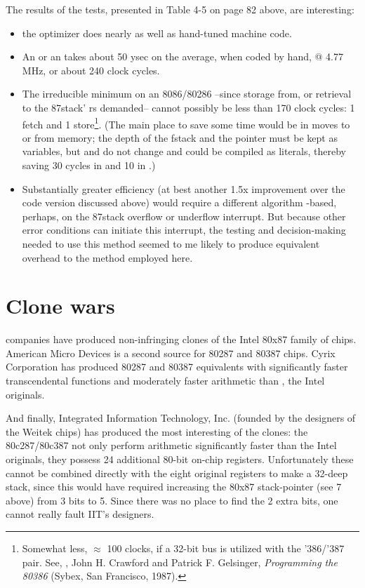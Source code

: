 The results of the tests, presented in Table 4-5 on page 82 above,
are interesting:
\begin{itemize}
    \item the optimizer does nearly as well as hand-tuned machine code.
    \item An  or an  takes about 50 ysec on the average, when coded by hand, @ 4.77 MHz, or about 240 clock cycles.
    \item The irreducible minimum on an 8086/80286 --since  storage from, or retrieval to the 87stack' rs demanded-- cannot possibly be less than 170 clock cycles: 1 fetch and 1 store\footnote{Somewhat less, $\approx$ 100 clocks, if a 32-bit bus is utilized with the '386/'387 pair. See, \eg, John H. Crawford and Patrick F. Gelsinger, \textit{Programming the 80386} (Sybex, San Francisco, 1987).}. (The main place to save some time would be in moves to or from memory; the depth of the fstack and the pointer must be kept as variables, but  and  do not change and could be compiled as literals, thereby saving 30 cycles in  and 10 in .)
    \item Substantially greater efficiency (at best another 1.5x improvement over the code version discussed above) would require a different algorithm -based, perhaps, on the 87stack overflow or underflow interrupt. But because other error conditions can initiate this interrupt, the testing and decision-making needed to use this method seemed to me likely to produce equivalent overhead to the method employed here.
\end{itemize}
\section{Clone wars}

 companies have produced non-infringing clones of the Intel 80x87 family of chips. American Micro Devices is a second source for 80287 and 80387 chips. Cyrix Corporation has produced 80287 and 80387 equivalents with significantly faster transcendental functions and moderately faster arithmetic than , the Intel originals.

And finally, Integrated Information Technology, Inc. (founded by the designers of the Weitek chips) has produced the most interesting of the clones: the 80c287/80c387 not only perform arithmetic significantly faster than the Intel originals, they possess 24 additional 80-bit on-chip registers. Unfortunately these cannot be combined directly with the eight original registers to make a 32-deep stack, since this would have required increasing the 80x87 stack-pointer (see 7 above) from 3 bits to 5. Since there was no place to find the 2 extra bits, one cannot really fault IIT's designers.

